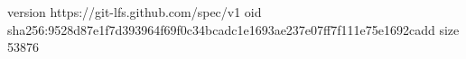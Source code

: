 version https://git-lfs.github.com/spec/v1
oid sha256:9528d87e1f7d393964f69f0c34bcadc1e1693ae237e07ff7f111e75e1692cadd
size 53876
